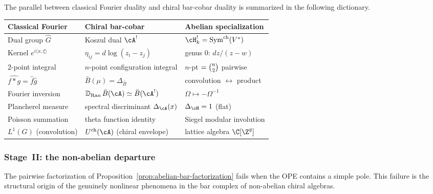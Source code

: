 The parallel between classical Fourier duality and chiral bar-cobar
duality is summarized in the following dictionary.

\medskip
\begin{center}
\small
\renewcommand{\arraystretch}{1.35}
\begin{tabular}{@{}lll@{}}
\hline
\textbf{Classical Fourier} & \textbf{Chiral bar-cobar}
  & \textbf{Abelian specialization} \\
\hline
Dual group $\hat{G}$
  & Koszul dual $\cA^!$
  & $\cH_k^! = \mathrm{Sym}^{\mathrm{ch}}(V^*)$ \\[2pt]
Kernel $e^{i\langle x,\xi\rangle}$
  & $\eta_{ij} = d\log(z_i - z_j)$
  & genus $0$: $dz/(z-w)$ \\[2pt]
$2$-point integral
  & $n$-point configuration integral
  & $n$-pt $= \tbinom{n}{2}$ pairwise \\[2pt]
$\widehat{f * g} = \hat{f}\hat{g}$
  & $\bar{B}(\mu) = \Delta_{\bar{B}}$
  & convolution $\leftrightarrow$ product \\[2pt]
Fourier inversion
  & $\mathbb{D}_{\mathrm{Ran}}\, \bar{B}(\cA)
    \simeq \bar{B}(\cA^!)$
  & $\Omega \mapsto -\Omega^{-1}$ \\[2pt]
Plancherel measure
  & spectral discriminant $\Delta_\cA(x)$
  & $\Delta_{\cH} = 1$ (flat) \\[2pt]
Poisson summation
  & theta function identity
  & Siegel modular involution \\[2pt]
$L^1(G)$ (convolution)
  & $U^{\mathrm{ch}}(\cA)$ (chiral envelope)
  & lattice algebra $\C[\Z^g]$ \\
\hline
\end{tabular}
\end{center}
\medskip

\subsubsection{Stage~II: the non-abelian departure}

The pairwise factorization of
Proposition~\ref{prop:abelian-bar-factorization} fails when the OPE
contains a simple pole.  This failure is the structural origin of
the genuinely nonlinear phenomena in the bar complex of non-abelian
chiral algebras.

